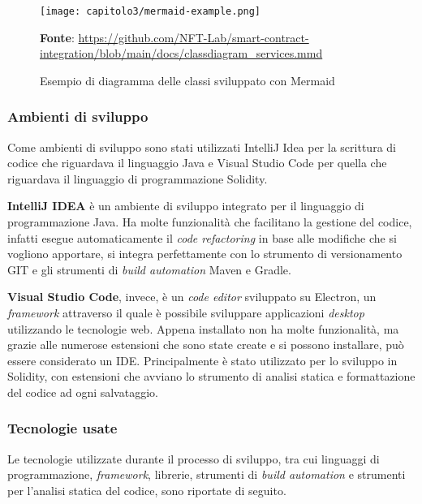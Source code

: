 \clearpage
\begin{figure}[h!]
  \centering
  \texttt{[image: capitolo3/mermaid-example.png]}
  \caption{Esempio di diagramma delle classi sviluppato con Mermaid}
  \textbf{Fonte}: \href{https://github.com/NFT-Lab/smart-contract-integration/blob/main/docs/classdiagram\_services.mmd}{https://github.com/NFT-Lab/smart-contract-integration/blob/main/docs/classdiagram\_services.mmd}
\end{figure}

\subsubsection{Ambienti di sviluppo}
Come ambienti di sviluppo sono stati utilizzati IntelliJ Idea per la scrittura di codice che riguardava il linguaggio Java e Visual Studio Code per quella che riguardava il linguaggio di programmazione Solidity.

\textbf{IntelliJ IDEA} è un ambiente di sviluppo integrato per il linguaggio di programmazione Java. Ha molte funzionalità che facilitano la gestione del codice, infatti esegue automaticamente il \textit{code refactoring} in base alle modifiche che si vogliono apportare, si integra perfettamente con lo strumento di versionamento GIT e gli strumenti di \textit{build automation} Maven e Gradle.

\textbf{Visual Studio Code}, invece, è un \textit{code editor} sviluppato su Electron, un \textit{framework} attraverso il quale è possibile sviluppare applicazioni \textit{desktop} utilizzando le tecnologie web. Appena installato non ha molte funzionalità, ma grazie alle numerose estensioni che sono state create e si possono installare, può essere considerato un IDE. Principalmente è stato utilizzato per lo sviluppo in Solidity, con estensioni che avviano lo strumento di analisi statica e formattazione del codice ad ogni salvataggio.

\subsubsection{Tecnologie usate}
Le tecnologie utilizzate durante il processo di sviluppo, tra cui linguaggi di programmazione, \textit{framework}, librerie, strumenti di \textit{build automation} e strumenti per l'analisi statica del codice, sono riportate di seguito.

